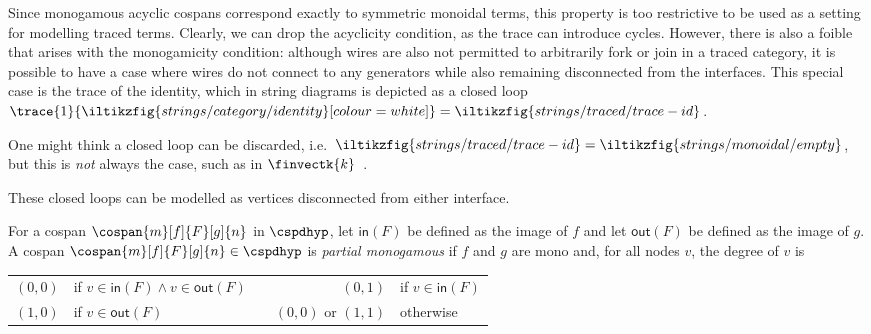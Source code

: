 Since monogamous acyclic cospans correspond exactly to symmetric monoidal terms,
this property is too restrictive to be used as a setting for modelling traced
terms.
Clearly, we can drop the acyclicity condition, as the trace can introduce
cycles.
However, there is also a foible that arises with the monogamicity condition:
although wires are also not permitted to arbitrarily fork or join in a traced
category, it is possible to have a case where wires do not connect to
any generators while also remaining disconnected from the interfaces.
This special case is the trace of the identity, which in string diagrams is
depicted as a closed
loop \(
\trace{1}{\iltikzfig{strings/category/identity}[colour=white]}
=
\iltikzfig{strings/traced/trace-id}
\).

\begin{remark}
    One might think a closed loop can be discarded, i.e.\ \(
    \iltikzfig{strings/traced/trace-id}
    =
    \iltikzfig{strings/monoidal/empty}
    \), but this is \emph{not} always the case, such as in
    \(\finvectk{k}\)~\cite[Sec. 6.1]{hasegawa1997recursion}.
\end{remark}

These closed loops can be modelled as vertices disconnected from either
interface.

\begin{definition}
    For a cospan \(\cospan{m}[f]{F}[g]{n}\) in
    \(\cspdhyp\), let \(\mathsf{in}(F)\) be defined as the image of \(f\) and
    let \(\mathsf{out}(F)\) be defined as the image of \(g\).
    A cospan \(\cospan{m}[f]{F}[g]{n} \in \cspdhyp\) is
    \emph{partial monogamous} if \(f\) and \(g\) are mono and, for all nodes
    \(v\), the degree of \(v\) is
    \begin{center}
        \begin{tabular}{rlcrl}
            \((0,0)\)
             &
            if \(v \in \mathsf{in}(F) \wedge v \in \mathsf{out}(F)\)
             &
            \quad
             &
            \((0,1)\)
             &
            if \(v \in \mathsf{in}(F)\)
            \\
            \((1,0)\)
             &
            if \(v \in \mathsf{out}(F)\)
             &
            \quad
             &
            \((0,0)\)
            or \((1,1)\)
             &
            otherwise
        \end{tabular}
    \end{center}
\end{definition}


